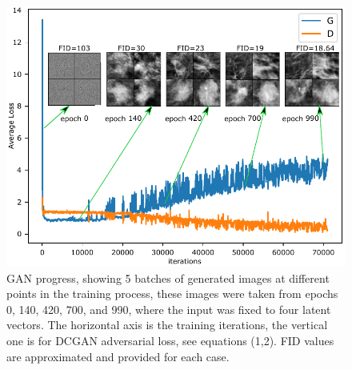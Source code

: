 \documentclass[final,3p,twocolumn,authoryear,sort&compress,times]{maia}
\begin{document}
\begin{figure}
    \centering
    \includegraphics[scale=1, angle=0]{figures/GAN_progress2.pdf}
    
    \caption{GAN progress, showing 5 batches of generated images at different points in the training process, these images were taken from epochs 0, 140, 420, 700, and 990, where the input was fixed to four latent vectors. The horizontal axis is the training iterations, the vertical one is for DCGAN adversarial loss, see equations (1,2). FID values are approximated and provided for each case.}
    \label{fig:GAN_prgoress}
\end{figure}
\end{document}
